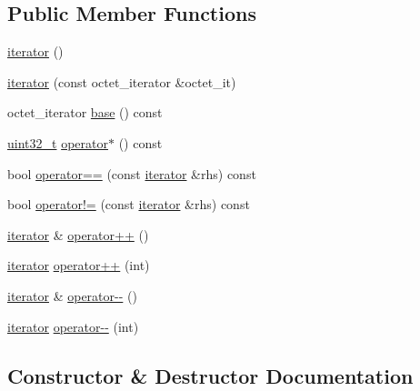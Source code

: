 \subsection*{Public Member Functions}
\begin{DoxyCompactItemize}
\item 
\hyperlink{classutf8_1_1unchecked_1_1iterator_a6564ecea96a82b87daca60a153ee1a6f}{iterator} ()
\item 
\hyperlink{classutf8_1_1unchecked_1_1iterator_a0f93d81989f2eb1038c0550431b9653b}{iterator} (const octet\+\_\+iterator \&octet\+\_\+it)
\item 
octet\+\_\+iterator \hyperlink{classutf8_1_1unchecked_1_1iterator_a9aca104f445e27a31fd755dcad2a5b60}{base} () const 
\item 
\hyperlink{namespaceutf8_a846259d2f173d524282583fc9d825b00}{uint32\+\_\+t} \hyperlink{classutf8_1_1unchecked_1_1iterator_a06b0df26a8570080c756f8d9a4cfdf76}{operator$\ast$} () const 
\item 
bool \hyperlink{classutf8_1_1unchecked_1_1iterator_aabb0ce8d23aa99bdddc70b9f41ee9d9a}{operator==} (const \hyperlink{classutf8_1_1unchecked_1_1iterator}{iterator} \&rhs) const 
\item 
bool \hyperlink{classutf8_1_1unchecked_1_1iterator_afd83ba10f6b423665e6b376759b21026}{operator!=} (const \hyperlink{classutf8_1_1unchecked_1_1iterator}{iterator} \&rhs) const 
\item 
\hyperlink{classutf8_1_1unchecked_1_1iterator}{iterator} \& \hyperlink{classutf8_1_1unchecked_1_1iterator_a0450ee39cf7eeed074d229fb9b6b22bc}{operator++} ()
\item 
\hyperlink{classutf8_1_1unchecked_1_1iterator}{iterator} \hyperlink{classutf8_1_1unchecked_1_1iterator_ae1cadaddd5c1db5518def5af491a1ff1}{operator++} (int)
\item 
\hyperlink{classutf8_1_1unchecked_1_1iterator}{iterator} \& \hyperlink{classutf8_1_1unchecked_1_1iterator_a8b50b3a0d7b2c2506e135db73a636c7b}{operator-\/-\/} ()
\item 
\hyperlink{classutf8_1_1unchecked_1_1iterator}{iterator} \hyperlink{classutf8_1_1unchecked_1_1iterator_a85597f5ae4bd175edb6dc2fc9ceb2f34}{operator-\/-\/} (int)
\end{DoxyCompactItemize}


\subsection{Constructor \& Destructor Documentation}
